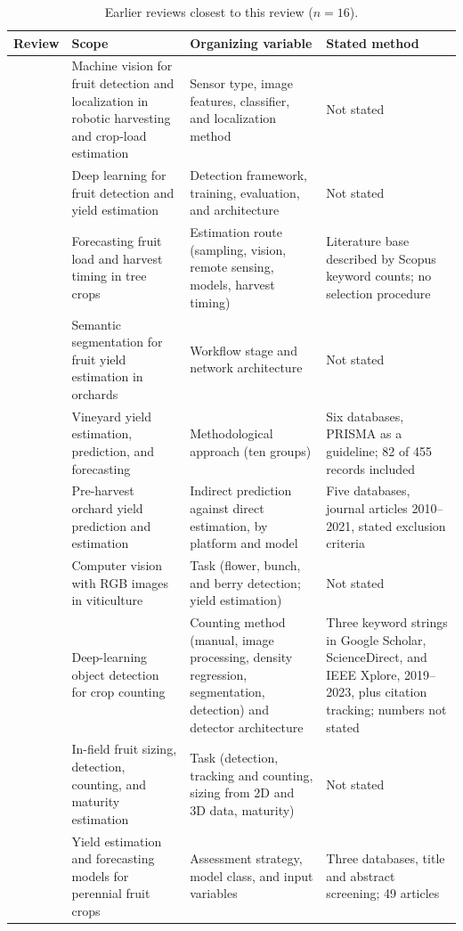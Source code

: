 \begin{table}[!t]
\centering
\caption{Earlier reviews closest to this review ($n=16$).}\label{tab:position}
\footnotesize
\begin{tabularx}{\textwidth}{@{}L{3.1cm}YL{3.6cm}L{3.6cm}@{}}
\toprule
Review & Scope & Organizing variable & Stated method\\
\midrule
\citet{gongal2015sensors} & Machine vision for fruit detection and localization in robotic harvesting and crop-load estimation & Sensor type, image features, classifier, and localization method & Not stated\\
\citet{koirala2019deepb} & Deep learning for fruit detection and yield estimation & Detection framework, training, evaluation, and architecture & Not stated\\
\citet{anderson2021technologies} & Forecasting fruit load and harvest timing in tree crops & Estimation route (sampling, vision, remote sensing, models, harvest timing) & Literature base described by Scopus keyword counts; no selection procedure\\
\citet{maheswari2021intelligent} & Semantic segmentation for fruit yield estimation in orchards & Workflow stage and network architecture & Not stated\\
\citet{barriguinha2021vineyard} & Vineyard yield estimation, prediction, and forecasting & Methodological approach (ten groups) & Six databases, PRISMA as a guideline; 82 of 455 records included\\
\citet{he2022fruit} & Pre-harvest orchard yield prediction and estimation & Indirect prediction against direct estimation, by platform and model & Five databases, journal articles 2010--2021, stated exclusion criteria\\
\citet{mohimont2022computer} & Computer vision with RGB images in viticulture & Task (flower, bunch, and berry detection; yield estimation) & Not stated\\
\citet{huang2023survey} & Deep-learning object detection for crop counting & Counting method (manual, image processing, density regression, segmentation, detection) and detector architecture & Three keyword strings in Google Scholar, ScienceDirect, and IEEE Xplore, 2019--2023, plus citation tracking; numbers not stated\\
\citet{miranda2023fruit} & In-field fruit sizing, detection, counting, and maturity estimation & Task (detection, tracking and counting, sizing from 2D and 3D data, maturity) & Not stated\\
\citet{magro2023computational} & Yield estimation and forecasting models for perennial fruit crops & Assessment strategy, model class, and input variables & Three databases, title and abstract screening; 49 articles\\

\end{tabularx}
\end{table}

